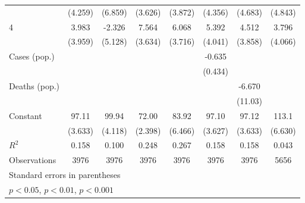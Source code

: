 \documentclass{article}
\begin{document}
{\begin{longtable}{l*{7}{c}}
                &  (4.259)         &  (6.859)         &  (3.626)         &  (3.872)         &  (4.356)         &  (4.683)         &  (4.843)         \\
4               &    3.983         &   -2.326         &    7.564\sym{*}  &    6.068         &    5.392         &    4.512         &    3.796         \\
                &  (3.959)         &  (5.128)         &  (3.634)         &  (3.716)         &  (4.041)         &  (3.858)         &  (4.066)         \\
Cases (pop.)    &                  &                  &                  &                  &   -0.635         &                  &                  \\
                &                  &                  &                  &                  &  (0.434)         &                  &                  \\
Deaths (pop.)   &                  &                  &                  &                  &                  &   -6.670         &                  \\
                &                  &                  &                  &                  &                  &  (11.03)         &                  \\
Constant        &    97.11\sym{***}&    99.94\sym{***}&    72.00\sym{***}&    83.92\sym{***}&    97.10\sym{***}&    97.12\sym{***}&    113.1\sym{***}\\
                &  (3.633)         &  (4.118)         &  (2.398)         &  (6.466)         &  (3.627)         &  (3.633)         &  (6.630)         \\
\hline
\(R^{2}\)       &    0.158         &    0.100         &    0.248         &    0.267         &    0.158         &    0.158         &    0.043         \\
Observations    &     3976         &     3976         &     3976         &     3976         &     3976         &     3976         &     5656         \\
\hline\hline
\multicolumn{8}{l}{\footnotesize Standard errors in parentheses}\\
\multicolumn{8}{l}{\footnotesize \sym{*} \(p<0.05\), \sym{**} \(p<0.01\), \sym{***} \(p<0.001\)}\\
\end{longtable}
}
\end{document}
